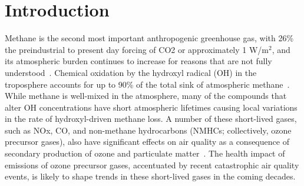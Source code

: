 \section{Introduction}



Methane is the second most important anthropogenic greenhouse gas, with 26\% the preindustrial to present day forcing of CO2 or approximately 1 W/m$^2$, and its atmospheric burden continues to increase for reasons that are not fully understood~\citep{ref:myhre2013}. Chemical oxidation by the hydroxyl radical (OH) in the troposphere accounts for up to 90\% of the total sink of atmospheric methane~\citep{ref:kirschke2013}. While methane is well-mixed in the atmosphere, many of the compounds that alter OH concentrations have short atmospheric lifetimes causing local variations in the rate of hydroxyl-driven methane loss. A number of these short-lived gases, such as NOx, CO, and non-methane hydrocarbons (NMHCs; collectively, ozone precursor gases), also have significant effects on air quality as a consequence of secondary production of ozone and particulate matter~\citep{ref:driscoll2015}. The health impact of emissions of ozone precursor gases, accentuated by recent catastrophic air quality events, is likely to shape trends in these short-lived gases in the coming decades.


